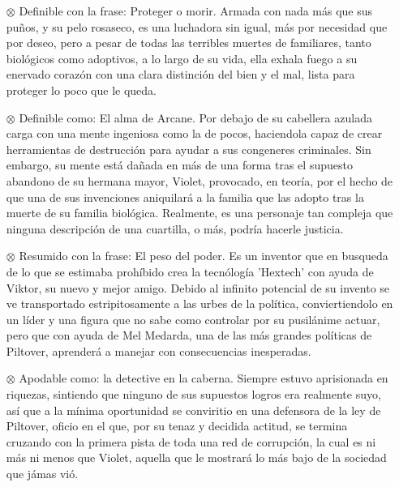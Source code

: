 \documentclass[11pt,A5]{article}
\begin{document}
\begin{itemize}
    \item[$\otimes$] {\textbf{}} Definible con la frase: Proteger o morir. Armada con nada más que sus puños, y su pelo rosaseco, es una luchadora sin igual, más por necesidad que por deseo, pero a pesar de todas las terribles muertes de familiares, tanto biológicos como adoptivos, a lo largo de su vida, ella exhala fuego a su enervado corazón con una clara distinción del bien y el mal, lista para proteger lo poco que le queda.
    \item[$\otimes$] {\textbf{}} Definible como: El alma de Arcane. Por debajo de su cabellera azulada carga con una mente ingeniosa como la de pocos, haciendola capaz de crear herramientas de destrucción para ayudar a sus congeneres criminales. Sin embargo, su mente está dañada en más de una forma tras el supuesto abandono de su hermana mayor, Violet, provocado, en teoría, por el hecho de que una de sus invenciones aniquilará a la familia que las adopto tras la muerte de su familia biológica. Realmente, es una personaje tan compleja que ninguna descripción de una cuartilla, o más, podría hacerle justicia.
    \item[$\otimes$] {\textbf{}} Resumido con la frase: El peso del poder. Es un inventor que en busqueda de lo que se estimaba prohíbido crea la tecnólogía 'Hextech' con ayuda de Viktor, su nuevo y mejor amigo. Debido al infinito potencial de su invento se ve transportado estripitosamente a las urbes de la política, conviertiendolo en un líder y una figura que no sabe como controlar por su pusilánime actuar, pero que con ayuda de Mel Medarda, una de las más grandes políticas de Piltover, aprenderá a manejar con consecuencias inesperadas.
    \item[$\otimes$] {\textbf{}} Apodable como: la detective en la caberna. Siempre estuvo aprisionada en riquezas, sintiendo que ninguno de sus supuestos logros era realmente suyo, así que a la mínima oportunidad se conviritio en una defensora de la ley de Piltover, oficio en el que, por su tenaz y decidida actitud, se termina cruzando con la primera pista de toda una red de corrupción, la cual es ni más ni menos que Violet, aquella que le mostrará lo más bajo de la sociedad que jámas vió.

\end{itemize}
\end{document}
